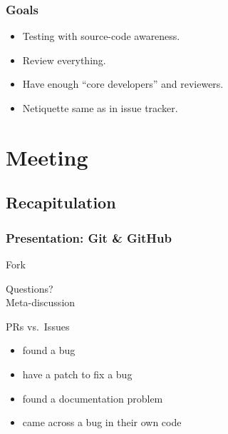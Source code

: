 \begin{frame}
	\frametitle{Goals}

	\begin{itemize}[<+-| alert@+>]
	\item Testing with source-code awareness.
	\item Review everything.
	\item Have enough ``core developers'' and reviewers.
	\item Netiquette same as in issue tracker.
	\end{itemize}
\end{frame}

%


\section{Meeting}


\subsection{Recapitulation}


\begin{frame}
	\frametitle{Presentation: Git \& GitHub}

	Fork
	\vspace{3cm}

	\begin{task}
	Questions? \\
	Meta-discussion
	\end{task}
\end{frame}




\begin{assignment}
	\begin{task}
	PRs vs.\ Issues
	\end{task}

	\begin{itemize}[<+-| alert@+>]
	\item found a bug
	\item have a patch to fix a bug
	\item found a documentation problem
	\item came across a bug in their own code
	\end{itemize}
\end{assignment}

